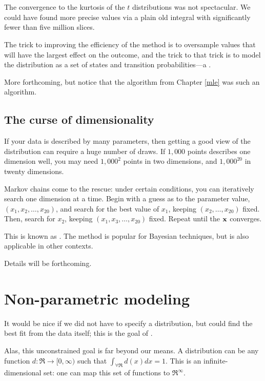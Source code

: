 \section{} 
The convergence to the kurtosis of the $t$ distributions was not
spectacular. We could have found more precise values via a plain old
integral with significantly fewer than five million slices. 

The trick to improving the efficiency of the method is to oversample
values that will have the largest effect on the outcome, and the trick
to that trick is to model the distribution as a set of states and
transition probabilities---a .

More forthcoming, but notice that the 
algorithm from Chapter \ref{mle} was such an algorithm.


\subsection{The curse of dimensionality}

If your data is described by
many parameters, then getting a good view of the distribution can require
a huge number of draws. If $1,000$ points describes one dimension well,
you may need $1,000^2$ points in two dimensions, and $1,000^{20}$ in
twenty dimensions. 

Markov chains come to the rescue: under certain conditions, you can
iteratively search one dimension at a time. Begin with a guess as to
the parameter value, $(x_1, x_2, \dots, x_{20})$, and search for the
best value of $x_1$, keeping
$(x_2, \dots, x_{20})$ fixed. Then, search for $x_2$, keeping
$(x_1, x_3,  \dots, x_{20})$ fixed. Repeat until the ${\bf x}$ converges.

This is known as .
The method is popular for Bayesian techniques, but is also applicable in
other contexts.

Details will be forthcoming.


\section{Non-parametric modeling}\label{nonparam} It would be nice if we did not
have to specify a distribution, but could find the best fit from the
data itself; this is the goal of . 

Alas, this unconstrained goal is far beyond our means.
A distribution can be any function $d:\Re \to [0,\infty)$ such that
$\int_{\forall \Re} d(x) dx = 1$. This is an infinite-dimensional set:
one can map this set of functions to $\Re^\infty$.

